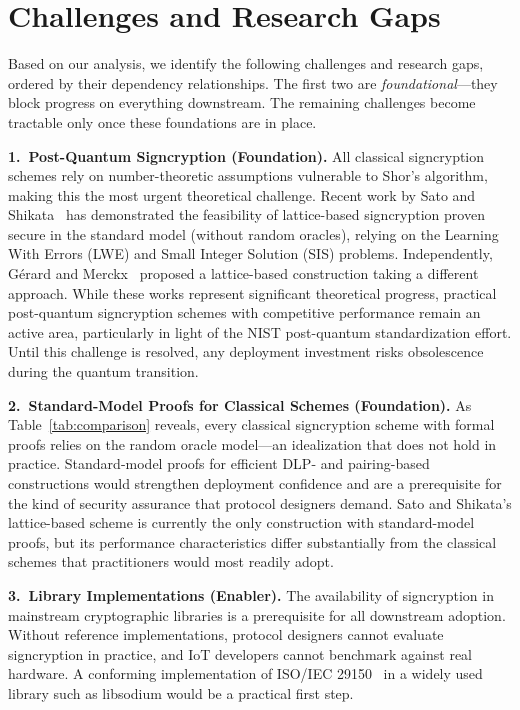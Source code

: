\documentclass[conference]{IEEEtran}
\begin{document}
\section{Challenges and Research Gaps}

Based on our analysis, we identify the following challenges and research gaps, ordered by their dependency relationships. The first two are \textit{foundational}---they block progress on everything downstream. The remaining challenges become tractable only once these foundations are in place.

\textbf{1.\ Post-Quantum Signcryption (Foundation).} All classical signcryption schemes rely on number-theoretic assumptions vulnerable to Shor's algorithm, making this the most urgent theoretical challenge. Recent work by Sato and Shikata~\cite{sato2018} has demonstrated the feasibility of lattice-based signcryption proven secure in the standard model (without random oracles), relying on the Learning With Errors (LWE) and Small Integer Solution (SIS) problems. Independently, G\'{e}rard and Merckx~\cite{gerard2018} proposed a lattice-based construction taking a different approach. While these works represent significant theoretical progress, practical post-quantum signcryption schemes with competitive performance remain an active area, particularly in light of the NIST post-quantum standardization effort. Until this challenge is resolved, any deployment investment risks obsolescence during the quantum transition.

\textbf{2.\ Standard-Model Proofs for Classical Schemes (Foundation).} As Table~\ref{tab:comparison} reveals, every classical signcryption scheme with formal proofs relies on the random oracle model---an idealization that does not hold in practice. Standard-model proofs for efficient DLP- and pairing-based constructions would strengthen deployment confidence and are a prerequisite for the kind of security assurance that protocol designers demand. Sato and Shikata's lattice-based scheme is currently the only construction with standard-model proofs, but its performance characteristics differ substantially from the classical schemes that practitioners would most readily adopt.

\textbf{3.\ Library Implementations (Enabler).} The availability of signcryption in mainstream cryptographic libraries is a prerequisite for all downstream adoption. Without reference implementations, protocol designers cannot evaluate signcryption in practice, and IoT developers cannot benchmark against real hardware. A conforming implementation of ISO/IEC 29150~\cite{iso29150} in a widely used library such as libsodium would be a practical first step.
\end{document}
